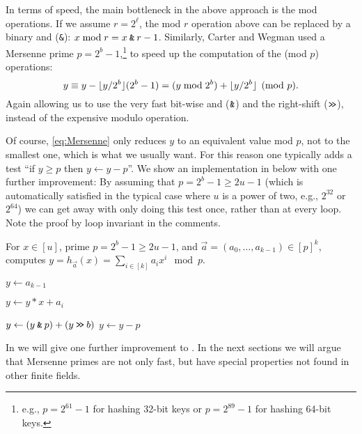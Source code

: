 In terms of speed, the main bottleneck in the above approach is the mod operations.
If we assume $r=2^\ell$, the mod $r$ operation above can be replaced by a binary {\sc and} (\texttt{\&}): $x \bmod r = x \mathbin{\texttt{\&}} r-1$.
Similarly, Carter and Wegman \cite{carter77universal} used a
Mersenne prime $p=2^b-1$,\footnote{e.g., $p=2^{61}-1$ for hashing 32-bit keys or
$p=2^{89}-1$ for hashing 64-bit keys.}
to speed up the computation of the (mod $p$) operations:
\begin{equation}
	y%
	\equiv y - \floor{y/2^b}(2^b-1)
	= (y\bmod 2^{b}) + \floor{y/2^b}
	\pmod {p}.
	\label{eq:Mersenne}
\end{equation}
Again allowing us to use the very fast bit-wise {\sc and} ($\mathbin{\texttt{\&}}$) and the right-shift ($\mathbin{\texttt{>\!>}}$),
instead of the expensive modulo operation.

Of course, \eqref{eq:Mersenne} only reduces $y$ to an equivalent value mod $p$, not to the smallest one, which is what we usually want.
For this reason one typically adds a test ``if $y \ge p$ then $y \gets y − p$''.
We show an implementation in  below with one further improvement:
By assuming that $p=2^b-1\geq 2u-1$
(which is automatically satisfied in the typical case where $u$ is a power
of two, e.g., $2^{32}$ or $2^{64}$)
we can get away with only doing this test once, rather than at every loop.
Note the proof by loop invariant in the comments.

\begin{algorithm}[H]
	\caption{
	For $x\in [u]$, prime $p=2^b-1\geq 2u-1$,
	and $\vec a=(a_0,\ldots,a_{k-1})\in[p]^k$,
	computes $y=h_{\vec a}(x)=\sum_{i\in[k]}a_i x^i\mod p$.
	}\label{alg:Mersenne}
	\begin{algorithmic}
		\State $y\gets a_{k-1}$

		\State $y\gets y*x+a_i$

		\State $y\gets (y\mathbin{\texttt{\&}} p)+(y\mathbin{\texttt{>\!>}} b)$
		\EndFor
		\State $y\gets y-p$
		\EndIf
	\end{algorithmic}
\end{algorithm}


In  we will give one further improvement to .
In the next sections we will argue that Mersenne primes are not only fast, but have special properties not found in other finite fields.


